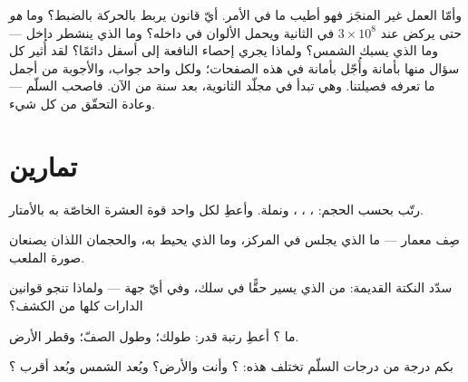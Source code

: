 \begin{remark}\label{rem:g9:atoms-to-galaxies:ahead}
وأمّا العمل غير المنجَز فهو أطيب ما في الأمر. أيّ قانون يربط
 بالحركة بالضبط؟ وما \emph{هو}  حتى يركض عند
$3 \times 10^{8}$  في الثانية ويحمل الألوان في داخله؟ وما
الذي ينشطر داخل  --- وما الذي يسبك  الشمس؟ ولماذا
يجري إحصاء  النافعة إلى أسفل دائمًا؟ لقد أُثير كل سؤال
منها بأمانة وأُجّل بأمانة في هذه الصفحات؛ ولكل واحد جواب،
والأجوبة من أجمل ما تعرفه فصيلتنا. وهي تبدأ في مجلّد
الثانوية، بعد سنة من الآن. فاصحب السلّم --- وعادة التحقّق من
كل شيء.
\end{remark}

\section{تمارين}

\begin{exercise}[$\star$]\label{exo:g9:atoms-to-galaxies:1}
رتّب بحسب الحجم: ، ، ، ونملة. وأعطِ لكل واحد
قوة العشرة الخاصّة به بالأمتار.
\end{exercise}

\begin{exercise}[$\star$]\label{exo:g9:atoms-to-galaxies:2}
صِف معمار  --- ما الذي يجلس في المركز، وما الذي يحيط
به، والحجمان اللذان يصنعان صورة الملعب.
\end{exercise}

\begin{exercise}[$\star$]\label{exo:g9:atoms-to-galaxies:3}
سدّد النكتة القديمة: من الذي يسير حقًّا في سلك، وفي أيّ جهة
--- ولماذا تنجو قوانين الدارات كلها من الكشف؟
\end{exercise}

\begin{exercise}[$\star$]\label{exo:g9:atoms-to-galaxies:4}
ما ؟ أعطِ رتبة قدر: طولك؛ وطول الصفّ؛ وقطر الأرض.
\end{exercise}

\begin{exercise}[$\star$]\label{exo:g9:atoms-to-galaxies:5}
بكم درجة من درجات السلّم تختلف هذه:  ؟ وأنت
والأرض؟ وبُعد الشمس وبُعد أقرب ؟
\end{exercise}

